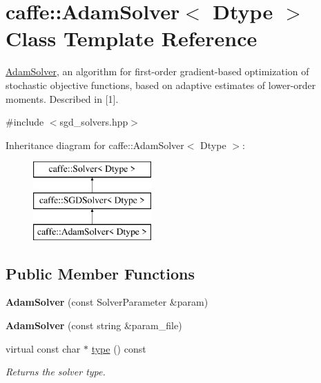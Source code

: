 \hypertarget{classcaffe_1_1AdamSolver}{}\section{caffe\+:\+:Adam\+Solver$<$ Dtype $>$ Class Template Reference}
\label{classcaffe_1_1AdamSolver}


\hyperlink{classcaffe_1_1AdamSolver}{Adam\+Solver}, an algorithm for first-\/order gradient-\/based optimization of stochastic objective functions, based on adaptive estimates of lower-\/order moments. Described in \mbox{[}1\mbox{]}.  




{\ttfamily \#include $<$sgd\+\_\+solvers.\+hpp$>$}

Inheritance diagram for caffe\+:\+:Adam\+Solver$<$ Dtype $>$\+:\begin{figure}[H]
\begin{center}
\leavevmode
\includegraphics[height=3.000000cm]{classcaffe_1_1AdamSolver}
\end{center}
\end{figure}
\subsection*{Public Member Functions}
\begin{DoxyCompactItemize}
\item 
{\bfseries Adam\+Solver} (const Solver\+Parameter \&param)\hypertarget{classcaffe_1_1AdamSolver_a2591a6002658a955d8df6a2bf1a28f1e}{}\label{classcaffe_1_1AdamSolver_a2591a6002658a955d8df6a2bf1a28f1e}

\item 
{\bfseries Adam\+Solver} (const string \&param\+\_\+file)\hypertarget{classcaffe_1_1AdamSolver_adfd87b65ecd4c57591eefc24ac16e292}{}\label{classcaffe_1_1AdamSolver_adfd87b65ecd4c57591eefc24ac16e292}

\item 
virtual const char $\ast$ \hyperlink{classcaffe_1_1AdamSolver_af1909fb3b7eda6ce169d724a586dddd6}{type} () const \hypertarget{classcaffe_1_1AdamSolver_af1909fb3b7eda6ce169d724a586dddd6}{}\label{classcaffe_1_1AdamSolver_af1909fb3b7eda6ce169d724a586dddd6}

\begin{DoxyCompactList}\small\item\em Returns the solver type. \end{DoxyCompactList}\end{DoxyCompactItemize}
